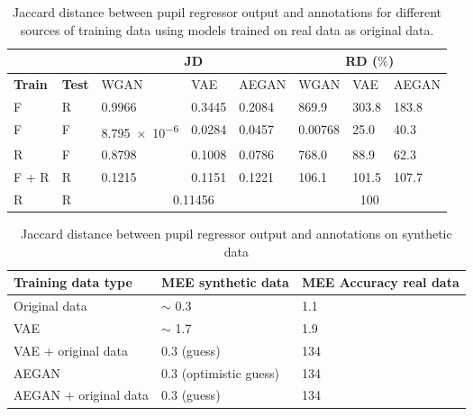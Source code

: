 \begin{table}[t]
    \centering
    \caption{Jaccard distance between pupil regressor output and annotations for different sources of training data using models trained on real data as original data.}
    \label{tab:quantitative_results}
    \begin{tabular}{|ll|lll|lll|}
        \cline{3-8}
        \multicolumn{2}{c}{ } & \multicolumn{3}{|c|}{JD} & \multicolumn{3}{c|}{RD ($\%$)} \\ \hline
        \textbf{Train} & \textbf{Test} & WGAN & VAE & AEGAN & WGAN & VAE & AEGAN \\ \hline
        F & R & \num{0.9966} & \num{0.3445} & \num{0.2084} & \num{869.9} & \num{303.8} & \num{183.8} \\
        F & F & \num{8.795e-6} & \num{0.0284} & \num{0.0457} & \num{0.00768} & \num{25.0} & \num{40.3} \\ 
        R & F & \num{0.8798} & \num{0.1008} & \num{0.0786} & \num{768.0} & \num{88.9} & \num{62.3} \\ 
        F + R & R & \num{0.1215} & \num{0.1151} & \num{0.1221} & \num{106.1} & \num{101.5} & \num{107.7} \\ 
        \hline
        R & R & \multicolumn{3}{c|}{\num{0.11456}} & \multicolumn{3}{c|}{100} \\
        \hline
    \end{tabular}
\end{table}

\begin{table}[t]
    \centering
    \caption{Jaccard distance between pupil regressor output and annotations on synthetic data}
    \label{tab:quantitative_results}
    \begin{tabular}{l|l|l}
    \hline
    Training data type      & MEE synthetic data  & MEE Accuracy real data \\ \hline
    Original data           & $\sim$ 0.3 & 1.1     \\
    VAE                     & $\sim$ 1.7 & 1.9     \\
    VAE + original data     & 0.3 (guess) & 134     \\
    AEGAN                   & 0.3 (optimistic guess) & 134     \\
    AEGAN + original data   & 0.3 (guess) & 134     \\
    \end{tabular}
\end{table}




